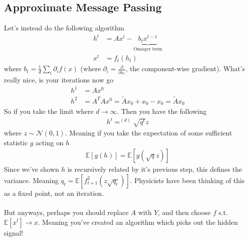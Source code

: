 \subsection{Approximate Message Passing}
Let's instead do the following algorithm
\begin{align}
	h^t & = A x^t - \underbrace{b_t x^{t-1}}_{\text{Onsager term}}\\
	x^t & = f_t(h_t) 
\end{align}
where $b_t = \frac{1}{d} \sum_i \partial_i f(x)$ (where $\partial_i = \frac{\partial}{\partial x_i}$, the component-wise gradient). What's really nice, is your iterations now go
\begin{align}
	h^1 & = A x^0\\
	h^2 & = A^T A x^0 = \tilde A x_0 + x_0 - x_0 = \tilde A x_0
\end{align}
So if you take the limit where $d \to \infty$. Then you have the following
\begin{align}
	h^t =^{(d)}  \sqrt{q^t} z
\end{align}
where $z \sim \mathcal N(0,1)$. Meaning if you take the expectation of some sufficient statistic $g$ acting on $h$
\begin{align}
	\mathbb E[g(h)] = \mathbb E[g(\sqrt{q} z)]
\end{align}
Since we've shown $h$ is recursively related by it's previous step, this defines the variance. Meaning $q_t = \mathbb E[f^2_{t+1}(z\sqrt{q_t})]$. Physicists have been thinking of this as a fixed point, not an iteration.\\
\\
But anyways, perhaps you should replace $A$ with $Y$, and then choose $f$ s.t. $\mathbb E [x^t] \to x$. Meaning you've created an algorithm which picks out the hidden signal!


